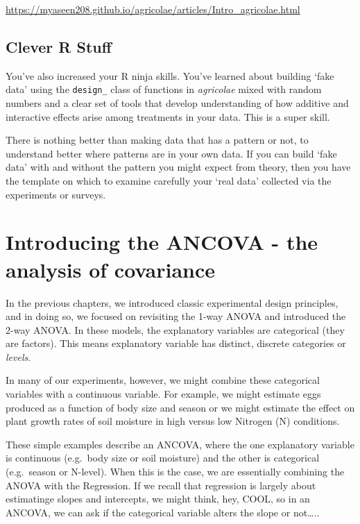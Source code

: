 \documentclass[
]{book}
\begin{document}
\url{https://myaseen208.github.io/agricolae/articles/Intro_agricolae.html}

\hypertarget{clever-r-stuff}{%
\section{Clever R Stuff}\label{clever-r-stuff}}

You've also increased your R ninja skills. You've learned about building `fake data' using the \texttt{design\_} class of functions in \emph{agricolae} mixed with random numbers and a clear set of tools that develop understanding of how additive and interactive effects arise among treatments in your data. This is a super skill.

There is nothing better than making data that has a pattern or not, to understand better where patterns are in your own data. If you can build `fake data' with and without the pattern you might expect from theory, then you have the template on which to examine carefully your `real data' collected via the experiments or surveys.

\hypertarget{introducing-the-ancova---the-analysis-of-covariance}{%
\chapter{Introducing the ANCOVA - the analysis of covariance}\label{introducing-the-ancova---the-analysis-of-covariance}}

In the previous chapters, we introduced classic experimental design principles, and in doing so, we focused on revisiting the 1-way ANOVA and introduced the 2-way ANOVA. In these models, the explanatory variables are categorical (they are factors). This means explanatory variable has distinct, discrete categories or \emph{levels}.

In many of our experiments, however, we might combine these categorical variables with a continuous variable. For example, we might estimate eggs produced as a function of body size and season or we might estimate the effect on plant growth rates of soil moisture in high versus low Nitrogen (N) conditions.

These simple examples describe an ANCOVA, where the one explanatory variable is continuous (e.g.~body size or soil moisture) and the other is categorical (e.g.~season or N-level). When this is the case, we are essentially combining the ANOVA with the Regression. If we recall that regression is largely about estimatinge slopes and intercepts, we might think, hey, COOL, so in an ANCOVA, we can ask if the categorical variable alters the slope or not\ldots..
\end{document}
